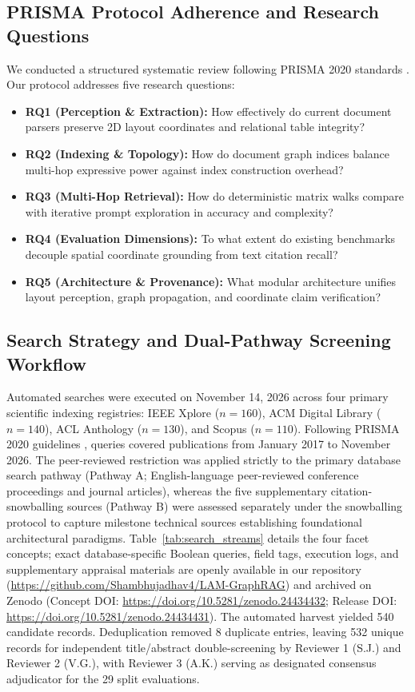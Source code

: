 \documentclass[conference,a4paper]{IEEEtran}
\begin{document}
\subsection{PRISMA Protocol Adherence and Research Questions}
We conducted a structured systematic review following PRISMA 2020 standards \cite{page2021prisma}. Our protocol addresses five research questions:
\begin{itemize}
    \item \textbf{RQ1 (Perception \& Extraction):} How effectively do current document parsers preserve 2D layout coordinates and relational table integrity?
    \item \textbf{RQ2 (Indexing \& Topology):} How do document graph indices balance multi-hop expressive power against index construction overhead?
    \item \textbf{RQ3 (Multi-Hop Retrieval):} How do deterministic matrix walks compare with iterative prompt exploration in accuracy and complexity?
    \item \textbf{RQ4 (Evaluation Dimensions):} To what extent do existing benchmarks decouple spatial coordinate grounding from text citation recall?
    \item \textbf{RQ5 (Architecture \& Provenance):} What modular architecture unifies layout perception, graph propagation, and coordinate claim verification?
\end{itemize}

\subsection{Search Strategy and Dual-Pathway Screening Workflow}
Automated searches were executed on November 14, 2026 across four primary scientific indexing registries: IEEE Xplore ($n=160$), ACM Digital Library ($n=140$), ACL Anthology ($n=130$), and Scopus ($n=110$). Following PRISMA 2020 guidelines \cite{page2021prisma}, queries covered publications from January 2017 to November 2026. The peer-reviewed restriction was applied strictly to the primary database search pathway (Pathway A; English-language peer-reviewed conference proceedings and journal articles), whereas the five supplementary citation-snowballing sources (Pathway B) were assessed separately under the snowballing protocol to capture milestone technical sources establishing foundational architectural paradigms. Table~\ref{tab:search_streams} details the four facet concepts; exact database-specific Boolean queries, field tags, execution logs, and supplementary appraisal materials are openly available in our repository (\url{https://github.com/Shambhujadhav4/LAM-GraphRAG}) and archived on Zenodo (Concept DOI: \url{https://doi.org/10.5281/zenodo.24434432}; Release DOI: \url{https://doi.org/10.5281/zenodo.24434431}). The automated harvest yielded 540 candidate records. Deduplication removed 8 duplicate entries, leaving 532 unique records for independent title/abstract double-screening by Reviewer 1 (S.J.) and Reviewer 2 (V.G.), with Reviewer 3 (A.K.) serving as designated consensus adjudicator for the 29 split evaluations.
\end{document}
